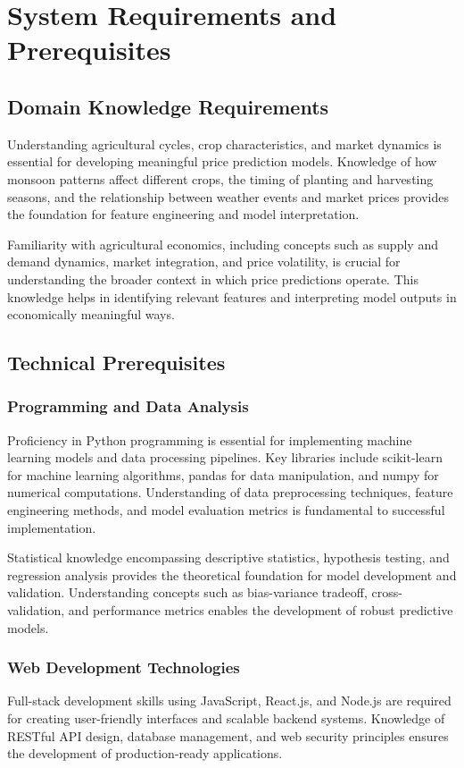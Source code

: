 \section{System Requirements and Prerequisites}

\subsection{Domain Knowledge Requirements}

Understanding agricultural cycles, crop characteristics, and market dynamics is essential for developing meaningful price prediction models. Knowledge of how monsoon patterns affect different crops, the timing of planting and harvesting seasons, and the relationship between weather events and market prices provides the foundation for feature engineering and model interpretation.

Familiarity with agricultural economics, including concepts such as supply and demand dynamics, market integration, and price volatility, is crucial for understanding the broader context in which price predictions operate. This knowledge helps in identifying relevant features and interpreting model outputs in economically meaningful ways.

\subsection{Technical Prerequisites}

\subsubsection{Programming and Data Analysis}
Proficiency in Python programming is essential for implementing machine learning models and data processing pipelines. Key libraries include scikit-learn for machine learning algorithms, pandas for data manipulation, and numpy for numerical computations. Understanding of data preprocessing techniques, feature engineering methods, and model evaluation metrics is fundamental to successful implementation.

Statistical knowledge encompassing descriptive statistics, hypothesis testing, and regression analysis provides the theoretical foundation for model development and validation. Understanding concepts such as bias-variance tradeoff, cross-validation, and performance metrics enables the development of robust predictive models.

\subsubsection{Web Development Technologies}
Full-stack development skills using JavaScript, React.js, and Node.js are required for creating user-friendly interfaces and scalable backend systems. Knowledge of RESTful API design, database management, and web security principles ensures the development of production-ready applications.

